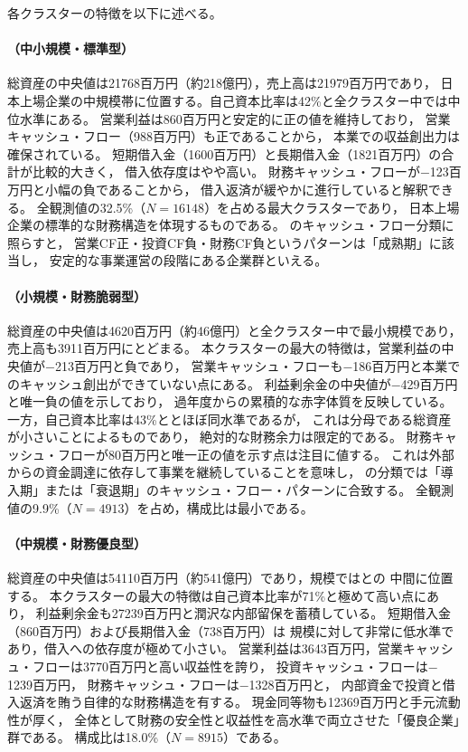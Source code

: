 各クラスターの特徴を以下に述べる。

\paragraph{（中小規模・標準型）}
総資産の中央値は\num{21768}百万円（約218億円），売上高は\num{21979}百万円であり，
日本上場企業の中規模帯に位置する。自己資本比率は42\%と全クラスター中では中位水準にある。
営業利益は\num{860}百万円と安定的に正の値を維持しており，
営業キャッシュ・フロー（\num{988}百万円）も正であることから，
本業での収益創出力は確保されている。
短期借入金（\num{1600}百万円）と長期借入金（\num{1821}百万円）の合計が比較的大きく，
借入依存度はやや高い。
財務キャッシュ・フローが$-$\num{123}百万円と小幅の負であることから，
借入返済が緩やかに進行していると解釈できる。
全観測値の32.5\%（$N=\num{16148}$）を占める最大クラスターであり，
日本上場企業の標準的な財務構造を体現するものである。
のキャッシュ・フロー分類に照らすと，
営業CF正・投資CF負・財務CF負というパターンは「成熟期」に該当し，
安定的な事業運営の段階にある企業群といえる。

\paragraph{（小規模・財務脆弱型）}
総資産の中央値は\num{4620}百万円（約46億円）と全クラスター中で最小規模であり，
売上高も\num{3911}百万円にとどまる。
本クラスターの最大の特徴は，営業利益の中央値が$-$\num{213}百万円と負であり，
営業キャッシュ・フローも$-$\num{186}百万円と本業でのキャッシュ創出ができていない点にある。
利益剰余金の中央値が$-$\num{429}百万円と唯一負の値を示しており，
過年度からの累積的な赤字体質を反映している。
一方，自己資本比率は43\%ととほぼ同水準であるが，
これは分母である総資産が小さいことによるものであり，
絶対的な財務余力は限定的である。
財務キャッシュ・フローが\num{80}百万円と唯一正の値を示す点は注目に値する。
これは外部からの資金調達に依存して事業を継続していることを意味し，
の分類では「導入期」または「衰退期」のキャッシュ・フロー・パターンに合致する。
全観測値の9.9\%（$N=\num{4913}$）を占め，構成比は最小である。

\paragraph{（中規模・財務優良型）}
総資産の中央値は\num{54110}百万円（約541億円）であり，規模ではとの
中間に位置する。
本クラスターの最大の特徴は自己資本比率が71\%と極めて高い点にあり，
利益剰余金も\num{27239}百万円と潤沢な内部留保を蓄積している。
短期借入金（\num{860}百万円）および長期借入金（\num{738}百万円）は
規模に対して非常に低水準であり，借入への依存度が極めて小さい。
営業利益は\num{3643}百万円，営業キャッシュ・フローは\num{3770}百万円と高い収益性を誇り，
投資キャッシュ・フローは$-$\num{1239}百万円，
財務キャッシュ・フローは$-$\num{1328}百万円と，
内部資金で投資と借入返済を賄う自律的な財務構造を有する。
現金同等物も\num{12369}百万円と手元流動性が厚く，
全体として財務の安全性と収益性を高水準で両立させた「優良企業」群である。
構成比は18.0\%（$N=\num{8915}$）である。

